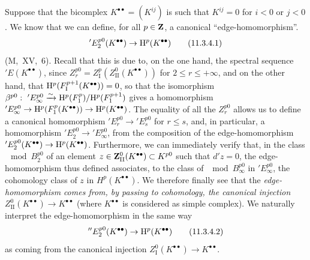 \begin{env}[11.3.4]
\label{0.11.3.4}
Suppose that the bicomplex $K^{\bullet\bullet}=(K^{ij})$ is such that $K^{ij}=0$ for $i<0$ or $j<0$.
We know that we can define, for all $p\in\mathbf{Z}$, a canonical ``edge-homomorphism''.
\[
\label{0.11.3.4.1}
  'E_2^{p0}(K^{\bullet\bullet})
  \rightarrow \mathrm{H}^{p}(K^{\bullet\bullet})
\tag{11.3.4.1}
\]
(M,~XV,~6).
Recall that this is due to, on the one hand, the spectral sequence
$'E(K^{\bullet\bullet})$, since $Z_r^{p0}=Z_{\mathrm{I}}^{p}(Z_{\mathrm{II}}^{0}(K^{\bullet\bullet}))$ for $2\leq r \leq +\infty$, and on the other hand, that $\mathrm{H}^{p}(F_\mathrm{I}^{p+1}(K^{\bullet\bullet})) = 0$, so that the isomorphism $\beta^{p0}:\ 'E_\infty^{p0} \xrightarrow{\sim} \mathrm{H}^{p}(F_1^p)/\mathrm{H}^{p}(F_1^{p+1})$ gives a homomorphism $'E_\infty^{p0} \rightarrow \mathrm{H}^{p}(F_1^p(K^{\bullet\bullet})) \rightarrow \mathrm{H}^{p}(K^{\bullet\bullet})$.
The equality of all the $Z_r^{p0}$ allows us to define a canonical homomorphism $'E_r^{p0} \rightarrow 'E_s^{p0}$ for $r \leq s$, and, in particular, a homomorphism $'E_2^{p0} \rightarrow 'E_\infty^{p0}$, from the composition of the edge-homomorphism $'E_2^{p0}(K^{\bullet\bullet}) \rightarrow \mathrm{H}^{p}(K^{\bullet\bullet})$.
Furthermore, we can immediately verify that, in the class $\mod B_2^{p0}$ of an element $z \in\mathbf{Z}_\mathrm{II}^0(K^{\bullet\bullet}) \subset K^{p0}$ such that $d'z=0$, the edge-homomorphism thus defined associates, to the class of $\mod B_\infty^{p0}$ in $'E_{\infty}^{p0}$, the cohomology class of $z$ in $H^p(K^{\bullet\bullet})$.
We therefore finally see that the \emph{edge-homomorphism}  \emph{comes from, by passing to cohomology, the canonical injection} $Z_\mathrm{II}^0(K^{\bullet\bullet}) \rightarrow K^{\bullet\bullet}$  (where $K^{\bullet\bullet}$ is considered as simple complex).
We naturally interpret the edge-homomorphism in the same way 
\[
\label{0.11.3.4.2}
  ''E_2^{p0}(K^{\bullet\bullet})
  \rightarrow \mathrm{H}^{p}(K^{\bullet\bullet})
\tag{11.3.4.2}
\]
as coming from the canonical injection $Z_\mathrm{I}^0(K^{\bullet\bullet}) \rightarrow K^{\bullet\bullet}$.
\end{env}

